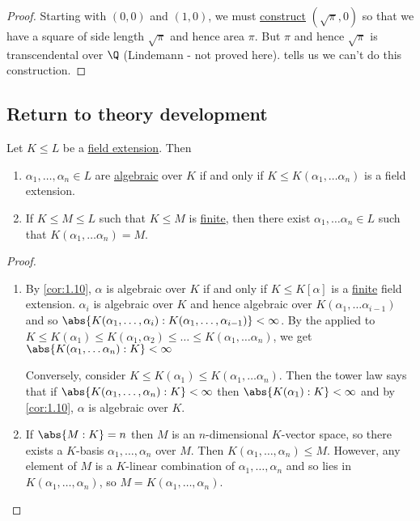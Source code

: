\documentclass{article}
\begin{document}
\begin{proof}
    Starting with $(0, 0)$ and $(1, 0)$, we must \hyperlink{def:constructible}{construct} $(\sqrt{\pi}, 0)$ so that we have a square of side length $\sqrt{\pi}$ and hence area $\pi$.
    But $\pi$ and hence $\sqrt{\pi}$ is transcendental over $\Q$ (Lindemann - not proved here).
     tells us we can't do this construction.
\end{proof}

\subsection{Return to theory development}
\begin{nlemma}\label{lem:1.19}
    Let $K \leq L$ be a \hyperlink{def:fieldExt}{field extension}. Then
    \begin{enumerate}[label=(\roman*)]
        \item $\alpha_1, \dotsc, \alpha_n \in L$ are \hyperlink{def:algebraic}{algebraic} over $K$ if and only if $K \leq K(\alpha_1, \dotsc \alpha_n)$ is a field extension.
        \item If $K \leq M \leq L$ such that $K \leq M$ is \hyperlink{def:degreeOfFieldExt}{finite}, then there exist $\alpha_1, \dotsc \alpha_n \in L$ such that $K(\alpha_1, \dotsc \alpha_n) = M$.
    \end{enumerate}
\end{nlemma}

\begin{proof}
    \leavevmode
    \begin{enumerate}[label=(\roman*)]
        \item By \cref{cor:1.10}, $\alpha$ is algebraic over $K$ if and only if $K \leq K[\alpha]$ is a \hyperlink{def:degreeOfFieldExt}{finite} field extension.
            $\alpha_i$ is algebraic over $K$ and hence algebraic over $K(\alpha_1, \dotsc \alpha_{i-1})$ and so
            $\abs{K(\alpha_1, \dotsc, \alpha_i):K(\alpha_1, \dotsc, \alpha_{i-1})} < \infty$.
            By the  applied to $K \leq K(\alpha_1) \leq K(\alpha_1, \alpha_2) \leq \dots \leq K(\alpha_1, \dotsc \alpha_n)$, we get $\abs{K(\alpha_1, \dotsc \alpha_n):K} < \infty$

            Conversely, consider $K \leq K(\alpha_1) \leq K(\alpha_1, \dotsc \alpha_n)$.
            Then the tower law says that if $\abs{K(\alpha_1, \dotsc, \alpha_n): K} < \infty$ then $\abs{K(\alpha_1):K} < \infty$ and by \cref{cor:1.10}, $\alpha$ is algebraic over $K$.

        \item If $\abs{M:K} = n$ then $M$ is an $n$-dimensional $K$-vector space, so there exists a $K$-basis $\alpha_1, \dotsc, \alpha_n$ over $M$.
            Then $K(\alpha_1, \dotsc, \alpha_n) \leq M$.
            However, any element of $M$ is a $K$-linear combination of $\alpha_1, \dotsc, \alpha_n$ and so lies in $K(\alpha_1, \dotsc, \alpha_n)$, so $M = K(\alpha_1, \dotsc, \alpha_n)$.
    \end{enumerate}
\end{proof}
\end{document}
